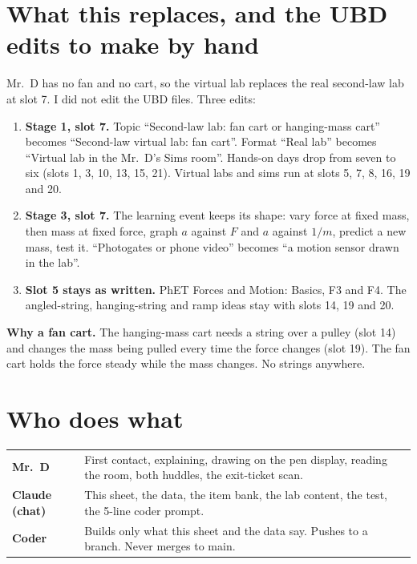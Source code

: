 \documentclass[10pt]{article}
\begin{document}
\section{What this replaces, and the UBD edits to make by hand}
Mr.\ D has no fan and no cart, so the virtual lab replaces the real second-law lab at slot 7. I did not edit the UBD files. Three edits:
\begin{enumerate}
\item \textbf{Stage 1, slot 7.} Topic “Second-law lab: fan cart or hanging-mass cart” becomes “Second-law virtual lab: fan cart”. Format “Real lab” becomes “Virtual lab in the Mr.\ D's Sims room”. Hands-on days drop from seven to six (slots 1, 3, 10, 13, 15, 21). Virtual labs and sims run at slots 5, 7, 8, 16, 19 and 20.
\item \textbf{Stage 3, slot 7.} The learning event keeps its shape: vary force at fixed mass, then mass at fixed force, graph $a$ against $F$ and $a$ against $1/m$, predict a new mass, test it. “Photogates or phone video” becomes “a motion sensor drawn in the lab”.
\item \textbf{Slot 5 stays as written.} PhET Forces and Motion: Basics, F3 and F4. The angled-string, hanging-string and ramp ideas stay with slots 14, 19 and 20.
\end{enumerate}
\textbf{Why a fan cart.} The hanging-mass cart needs a string over a pulley (slot 14) and changes the mass being pulled every time the force changes (slot 19). The fan cart holds the force steady while the mass changes. No strings anywhere.

\section{Who does what}
\begin{tabularx}{\linewidth}{@{}l Y@{}}\toprule
\textbf{Mr.\ D} & First contact, explaining, drawing on the pen display, reading the room, both huddles, the exit-ticket scan.\\
\textbf{Claude (chat)} & This sheet, the data, the item bank, the lab content, the test, the 5-line coder prompt.\\
\textbf{Coder} & Builds only what this sheet and the data say. Pushes to a branch. Never merges to main.\\
\bottomrule\end{tabularx}
\end{document}

